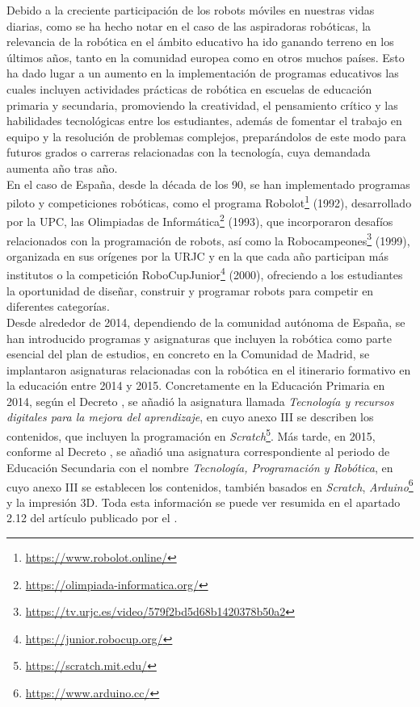 Debido a la creciente participación de los robots móviles en nuestras vidas
diarias, como se ha hecho notar en el caso de las aspiradoras robóticas, la
relevancia de la robótica en el ámbito educativo ha ido ganando terreno en los
últimos años, tanto en la comunidad europea como en otros muchos países.
Esto ha dado lugar a un aumento en la implementación de programas educativos las
cuales incluyen actividades prácticas de robótica en escuelas de educación
primaria y secundaria, promoviendo la creatividad, el pensamiento crítico y las
habilidades tecnológicas entre los estudiantes, además de fomentar el trabajo en
equipo y la resolución de problemas complejos, preparándolos de este modo para
futuros grados o carreras relacionadas con la tecnología, cuya demandada aumenta
año tras año.
\\

En el caso de España, desde la década de los 90, se han implementado programas
piloto y competiciones robóticas, como el programa Robolot\footnote{
\url{https://www.robolot.online/}} (1992), desarrollado por la UPC, las
Olimpiadas de Informática\footnote{\url{https://olimpiada-informatica.org/}}
(1993), que incorporaron desafíos relacionados con la programación de robots,
así como la Robocampeones\footnote{
\url{https://tv.urjc.es/video/579f2bd5d68b1420378b50a2}} (1999), organizada en
sus orígenes por la URJC y en la que cada año participan más institutos o la
competición RoboCupJunior\footnote{\url{https://junior.robocup.org/}} (2000),
ofreciendo a los estudiantes la oportunidad de diseñar, construir y programar
robots para competir en diferentes categorías.
\\

Desde alrededor de 2014, dependiendo de la comunidad autónoma de España, se han
introducido programas y asignaturas que incluyen la robótica como parte esencial
del plan de estudios, en concreto en la Comunidad de Madrid, se implantaron
asignaturas relacionadas con la robótica en el itinerario formativo en la
educación entre 2014 y 2015.
Concretamente en la Educación Primaria en 2014, según el Decreto
\citet{Decreto2014}, se añadió la asignatura llamada \textit{Tecnología y
recursos digitales para la mejora del aprendizaje}, en cuyo anexo III se
describen los contenidos, que incluyen la programación en
\textit{Scratch}\footnote{\url{https://scratch.mit.edu/}}.
Más tarde, en 2015, conforme al Decreto \citet{Decreto2015}, se añadió una
asignatura correspondiente al periodo de Educación Secundaria con el nombre
\textit{Tecnología, Programación y Robótica}, en cuyo anexo III se establecen
los contenidos, también basados en \textit{Scratch},
\textit{Arduino}\footnote{\url{https://www.arduino.cc/}} y la impresión 3D.
Toda esta información se puede ver resumida en el apartado 2.12 del artículo
publicado por el \citet{EducacionRob}.
\\

